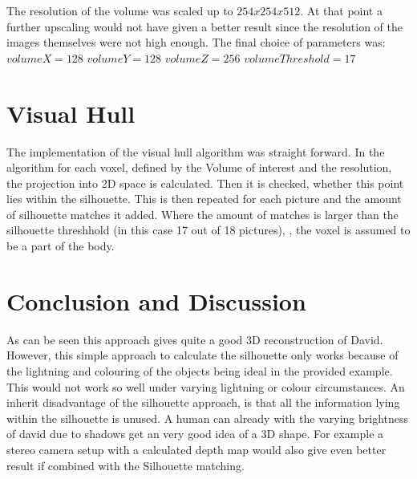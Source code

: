 \documentclass[12pt]{article}
\begin{document}
The resolution of the volume was scaled up to $254x254x512$. At that point a further upscaling would not have given a better result since the resolution of the images themselves were not high enough. The final choice of parameters was:
\vspace{5mm}
\newline
$volumeX = 128$
\vspace{5mm}
\newline
$volumeY = 128$
\vspace{5mm}
\newline
$volumeZ = 256$
\vspace{5mm}
\newline
$volumeThreshold = 17$
\vspace{5mm}
\newline
\section{Visual Hull }

The implementation of the visual hull algorithm was straight forward. In the algorithm for each voxel, defined by the Volume of interest and the resolution, the projection into 2D space is calculated. Then it is checked, whether this point lies within the silhouette. This is then repeated for each picture and the amount of silhouette matches it added. Where the amount of matches is larger than the silhouette threshhold (in this case 17 out of 18 pictures), , the voxel is assumed to be a part of the body. 



\section{Conclusion and Discussion}

As can be seen this approach gives quite a good 3D reconstruction of David. However, this simple approach to calculate the silhouette only works because of the lightning and colouring of the objects being ideal in the provided example. This would not work so well under varying lightning or colour circumstances. 
\newline
An inherit disadvantage of the silhouette approach, is that all the information lying within the silhouette is unused. A human can already with the varying brightness of david due to shadows get an very good idea of a 3D shape. 
\newline
For example a stereo camera setup with a calculated depth map would also give even better result if combined with the Silhouette matching. 
\end{document}
